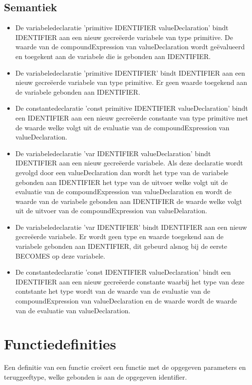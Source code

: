     \subsection{Semantiek}
        \begin{itemize}
        \item De variabeledeclaratie 'primitive IDENTIFIER valueDeclaration' bindt IDENTIFIER aan een nieuw gecre\"{e}erde variabele van type primitive. De waarde van de compoundExpression van valueDeclaration wordt ge\"{e}valueerd en toegekent aan de variabele die is gebonden aan IDENTIFIER. 
        \item De variabeledeclaratie 'primitive IDENTIFIER' bindt IDENTIFIER aan een nieuw gecre\"{e}erde variabele van type primitive. Er geen waarde toegekend aan de variabele gebonden aan IDENTIFIER.
        \item De constantedeclaratie 'const primitive IDENTIFIER valueDeclaration' bindt een IDENTIFIER aan een nieuw gecre\"{e}erde constante van type primitive met de waarde welke volgt uit de evaluatie van de compoundExpression van valueDeclaration.
        \item De variabeledeclaratie 'var IDENTIFIER valueDeclaration' bindt IDENTIFIER aan een nieuw gecre\"{e}erde variabele. Als deze declaratie wordt gevolgd door een valueDeclaration dan wordt het type van de variabele gebonden aan IDENTIFIER het type van de uitvoer welke volgt uit de evaluatie van de compoundExpression van valueDeclaration en wordt de waarde van de variabele gebonden aan IDENTIFIER de waarde welke volgt uit de uitvoer van de compoundExpression van valueDelaration.
        \item De variabeledeclaratie 'var IDENTIFIER' bindt IDENTIFIER aan een nieuw gecre\"{e}erde variabele. Er wordt geen type en waarde toegekend aan de variabele gebonden aan IDENTIFIER, dit gebeurd alsnog bij de eerste BECOMES op deze variabele.
        \item De constantedeclaratie 'const IDENTIFIER valueDeclaration' bindt een IDENTIFIER aan een nieuw gecre\"{e}erde constante waarbij het type van deze contstante het type wordt van de waarde van de evaluatie van de compoundExpression van valueDeclaration en de waarde wordt de waarde van de evaluatie van valueDeclaration. 
        \end{itemize}

\section{Functiedefinities}
Een definitie van een functie cre\"{e}ert een functie met de opgegeven parameters en teruggeeftype, welke gebonden is aan de opgegeven identifier.
